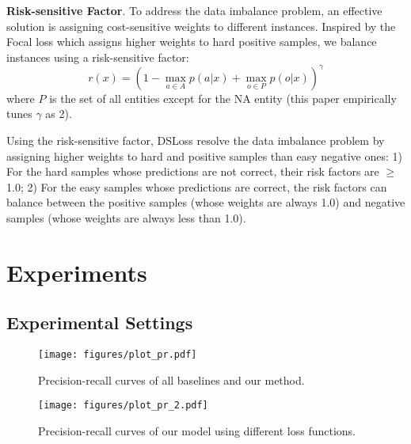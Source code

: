 \documentclass[11pt,a4paper]{article}
\begin{document}
  \textbf{Risk-sensitive Factor}.
  To address the data imbalance problem, an effective solution is assigning cost-sensitive weights to different instances. Inspired by the Focal loss \cite{lin_focal_2018} which assigns higher weights to hard positive samples, we balance instances using a risk-sensitive factor:
  \begin{equation}
    r(x) = (1 - \max_{a \in A} p(a|x) + \max_{o \in P} p(o |x))^\gamma
  \end{equation}
  \noindent where $P$ is the set of all entities except for the NA entity (this paper empirically tunes $\gamma$ as 2).
  
  Using the risk-sensitive factor, DSLoss resolve the data imbalance problem by assigning higher weights to hard and positive samples than easy negative ones:
  1) For the hard samples whose predictions are not correct, their risk factors are $\geq$ 1.0;
  2) For the easy samples whose predictions are correct, the risk factors can balance between the positive samples (whose weights are always 1.0) and negative samples (whose weights are always less than 1.0).
  
  \section{Experiments}
  
  \subsection{Experimental Settings}
  
  \begin{figure*}[!htp]
    \begin{minipage}[b]{0.95\columnwidth}
      \setlength{\abovecaptionskip}{-0.1em}
      \setlength{\belowcaptionskip}{-0.5em}
      \centering
      \texttt{[image: figures/plot\_pr.pdf]}
      \caption{Precision-recall curves of all baselines and our method.}
      \label{fig:held-out}
    \end{minipage}
    \hspace{2em}
    \begin{minipage}[b]{0.95\columnwidth}
      \setlength{\abovecaptionskip}{-0.1em}
      \setlength{\belowcaptionskip}{-0.5em}
      \centering  
      \texttt{[image: figures/plot\_pr\_2.pdf]}
      \caption{Precision-recall curves of our model using different loss functions.}
      \label{fig:ablation}
    \end{minipage}
  \end{figure*}
  
\end{document}
